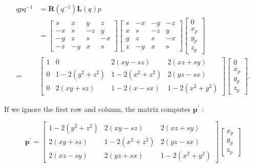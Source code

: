 \documentclass[10pt]{article}
\begin{document}
$$
\begin{aligned}
q p q^{-1} & =\mathbf{R}\left(q^{-1}\right) \mathbf{L}(q) p \\
& =\left[\begin{array}{cccc}
s & x & y & z \\
-x & s & -z & y \\
-y & z & s & -x \\
-z & -y & x & s
\end{array}\right]\left[\begin{array}{cccc}
s & -x & -y & -z \\
x & s & -z & y \\
y & z & s & -x \\
z & -y & x & s
\end{array}\right]\left[\begin{array}{c}
0 \\
x_{p} \\
y_{p} \\
z_{p}
\end{array}\right] \\
= & {\left[\begin{array}{cccc}
1 & 0 & 2(x y-s z) & 2(x z+s y) \\
0 & 1-2\left(y^{2}+z^{2}\right) & 1-2\left(x^{2}+z^{2}\right) & 2(y z-s x) \\
0 & 2(x y+s z) & 1-2(x-s x) & 1-2\left(x^{2}+y^{2}\right)
\end{array}\right]\left[\begin{array}{c}
0 \\
x_{p} \\
y_{p} \\
z_{p}
\end{array}\right] . }
\end{aligned}
$$

If we ignore the first row and column, the matrix computes $\mathbf{p}^{\prime}$ :

$$
\mathbf{p}^{\prime}=\left[\begin{array}{ccc}
1-2\left(y^{2}+z^{2}\right) & 2(x y-s z) & 2(x z+s y) \\
2(x y+s z) & 1-2\left(x^{2}+z^{2}\right) & 2(y z-s x) \\
2(x z-s y) & 2(y z+s x) & 1-2\left(x^{2}+y^{2}\right)
\end{array}\right]\left[\begin{array}{l}
x_{p} \\
y_{p} \\
z_{p}
\end{array}\right]
$$
\end{document}
